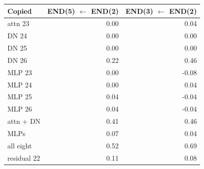 \begin{tabular}{lrr}
\toprule
Copied & END(5) $\leftarrow$ END(2) & END(3) $\leftarrow$ END(2) \\
\midrule
attn 23 & 0.00 & 0.04 \\
DN 24 & 0.00 & 0.00 \\
DN 25 & 0.00 & 0.00 \\
DN 26 & 0.22 & 0.46 \\
MLP 23 & 0.00 & -0.08 \\
MLP 24 & 0.00 & 0.04 \\
MLP 25 & 0.04 & -0.04 \\
MLP 26 & 0.04 & -0.04 \\
attn + DN & 0.41 & 0.46 \\
MLPs & 0.07 & 0.04 \\
all eight & 0.52 & 0.69 \\
residual 22 & 0.11 & 0.08 \\
\bottomrule
\end{tabular}
